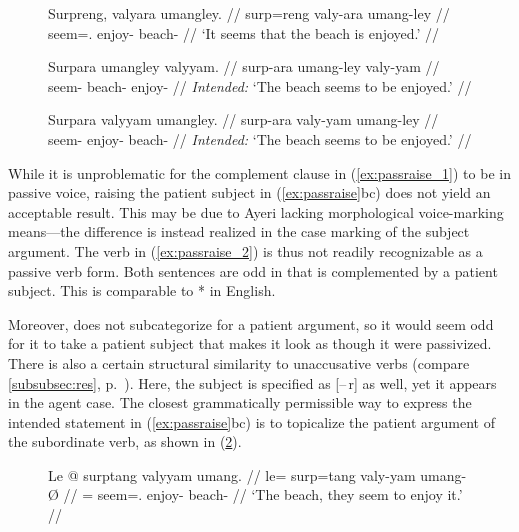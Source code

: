 \begin{figure}
\pex\label{ex:passraise}
\a\label{ex:passraise_1}\begingl
	\gla Surpreng, valyara umangley. //
	\glb surp=reng valy-ara umang-ley //
	\glc seem=\TsgI{}.\Aarg{} enjoy-\TsgI{} beach-\PargI{} //
	\glft `It seems that the beach is enjoyed.' //
\endgl

\a\label{ex:passraise_2}\ljudge*\begingl
	\gla Surpara umangley valyyam. //
	\glb surp-ara umang-ley valy-yam //
	\glc seem-\TsgI{} beach-\PargI{} enjoy-\Ptcp{} //
	\glft \textit{Intended:} `The beach seems to be enjoyed.' //
\endgl

\a\label{ex:passraise_3}\ljudge*\begingl
	\gla Surpara valyyam umangley. //
	\glb surp-ara valy-yam umang-ley //
	\glc seem-\TsgI{} enjoy-\Ptcp{} beach-\PargI{} //
	\glft \textit{Intended:} `The beach seems to be enjoyed.' //
\endgl
\xe
\end{figure}

While it is unproblematic for the complement clause in (\ref{ex:passraise_1})
to be in passive voice, raising the patient subject in (\ref{ex:passraise}bc)
does not yield an acceptable result. This may be due to Ayeri lacking
morphological voice-marking means---the difference is instead realized in the
case marking of the subject argument. The verb  in
(\ref{ex:passraise_2}) is thus not readily recognizable as a passive verb form.
Both sentences are odd in that  is complemented by a
patient subject. This is comparable to *
in English.

Moreover,  does not subcategorize for a patient argument,
so it would seem odd for it to take a patient subject that makes it look as
though it were passivized. There is also a certain structural similarity to
unaccusative verbs (compare \autoref{subsubsec:res},
p.~\pageref{subsubsec:res}). Here, the subject is specified as [–\,r] as well,
yet it appears in the agent case. The closest grammatically permissible way
to express the intended statement in (\ref{ex:passraise}bc) is to topicalize
the patient argument of the subordinate verb, as shown in (\ref{ex:raisept}).

\begin{figure}
\ex\label{ex:raisept}\begingl
	\gla Le @ surptang valyyam umang. //
	\glb le= surp=tang valy-yam umang-Ø //
	\glc \PatTI{}= seem=\TplM.\Aarg{} enjoy-\Ptcp{} beach-\Top{} //
	\glft `The beach, they seem to enjoy it.' //
\endgl\xe
\end{figure}

